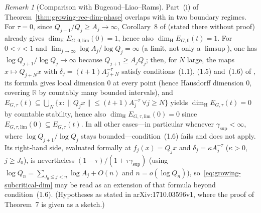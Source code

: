 \documentclass[11pt]{article}
\theoremstyle{definition}
\theoremstyle{remark}
\newtheorem{remark}[theorem]{Remark}
\newcommand{\R}{\mathbb{R}}
\newcommand{\dimH}{\dim_{\mathrm{H}}}
\begin{document}
\begin{remark}[Comparison with Bugeaud--Liao--Rams]\label{rem:growing-BLR}
Part~(i) of Theorem~\ref{thm:growing-rec-dim-phase} overlaps with \cite{BLR} in two
boundary regimes. For $\tau=0$, since $Q_{j+1}/Q_j\ge A_j\to\infty$, Corollary~8 of
\cite{BLR} (stated there without proof) already gives
$\dimH E_{G,0,\mathrm{lim}}(0)=1$, hence also
$\dimH E_{G,0}(t)=1$. For $0<\tau<1$ and $\lim_{j\to\infty}\log A_j/\log Q_j=\infty$
(a limit, not only a $\limsup$), one has $\log Q_{j+1}/\log Q_j\to\infty$ because
$Q_{j+1}\ge A_jQ_j$; then, for $N$ large, the maps $x\mapsto Q_{j+N}x$ with
$\delta_j=(t+1)A_{j+N}^{-\tau}$ satisfy conditions~(1.1), (1.5) and~(1.6) of
\cite[Theorem~7]{BLR}, its formula gives local dimension $0$ at every point (hence
Hausdorff dimension $0$, covering $\R$ by countably many bounded intervals), and
$E_{G,\tau}(t)\subseteq\bigcup_N\{x:\|Q_jx\|\le(t+1)A_j^{-\tau}\ \forall j\ge N\}$
yields $\dimH E_{G,\tau}(t)=0$ by countable stability, hence also
$\dimH E_{G,\tau,\mathrm{lim}}(0)=0$ since $E_{G,\tau,\mathrm{lim}}(0)\subseteq E_{G,\tau}(t)$.
In all other cases---in
particular whenever $\gamma_{\sup}<\infty$, where $\log Q_{j+1}/\log Q_j$ stays
bounded---condition~(1.6) fails and \cite[Theorem~7]{BLR} does not apply. Its
right-hand side, evaluated formally at $f_j(x)=Q_jx$ and $\delta_j=\kappa A_j^{-\tau}$
($\kappa>0$, $j\ge J_0$), is
nevertheless $(1-\tau)/(1+\tau\gamma_{\sup})$ (using $\log Q_n=\sum_{J_0\le j<n}\log A_j+O(n)$
and $n=o(\log Q_n)$), so~\eqref{eq:growing-subcritical-dim} may be read as an extension
of that formula beyond condition~(1.6). (Hypotheses as stated in arXiv:1710.03596v1, where the proof of Theorem~7 is
given as a sketch.)
\end{remark}
\end{document}
